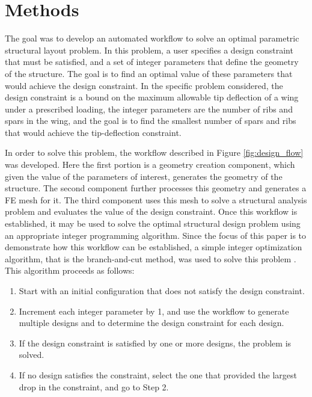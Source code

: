 \documentclass[conf]{new-aiaa}
\begin{document}
\section{Methods} \label{sec:methods}
The goal was to develop an automated workflow to solve an 
optimal parametric structural layout problem. 
In this problem, a user specifies a design constraint that must be satisfied, 
and a set of integer parameters that define the geometry of the structure. 
The goal is to find an optimal value of these parameters that would achieve 
the design constraint. 
In the specific problem considered, the 
design constraint is a bound on the maximum allowable tip deflection of 
a wing under a prescribed loading, the integer parameters are the number 
of ribs and spars in the wing, and the goal is to find the smallest 
number of spars and ribs that would achieve the tip-deflection constraint. 

In order to solve this problem, the workflow 
described in Figure \ref{fig:design_flow} was developed.
Here the first portion is a geometry creation component, 
which given the value of the parameters of interest, 
generates the geometry of the structure. 
The second component further processes this geometry and generates 
a FE mesh for it. 
The third component uses this mesh to solve a structural analysis 
problem and evaluates the value of the design constraint. 
Once this workflow is established, it may be used to solve the optimal 
structural design problem using an appropriate integer programming algorithm. 
Since the focus of this paper is to demonstrate how this workflow 
can be established, a simple integer optimization 
algorithm, that is the branch-and-cut method, was used to solve this problem
\cite{padberg_branch_and_cut_algorithm_for_resolution_of_sym_traveling_salesman}. 
This algorithm proceeds as follows:

\begin{enumerate}
  \item Start with an initial configuration that does not satisfy the design constraint. 
  \item Increment each integer parameter by 1, 
          and use the workflow to generate multiple designs and to determine 
          the design constraint for each design.
  \item If the design constraint is satisfied by one or more designs, the problem is solved. 
  \item If no design satisfies the constraint, select the one that provided the largest 
          drop in the constraint, and go to Step 2. 
\end{enumerate}
\end{document}
